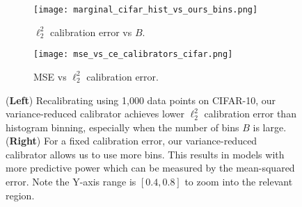 \begin{figure}
  \centering
  \centering
     \begin{subfigure}[b]{0.55\textwidth}
         \centering
         \texttt{[image: marginal\_cifar\_hist\_vs\_ours\_bins.png]}
         \caption{$\ell_2^2$ calibration error vs $B$.}
         \label{fig:marginal_calibrator_comparison_cifar}
     \end{subfigure}
     \hfill
     \begin{subfigure}[b]{0.4\textwidth}
         \centering
         \texttt{[image: mse\_vs\_ce\_calibrators\_cifar.png]}
         \caption{MSE vs $\ell_2^2$ calibration error.}
         \label{fig:cifar_calibrator_cmp_mse_ce}
     \end{subfigure}
  \caption{
  (\textbf{Left}) Recalibrating using 1,000 data points on CIFAR-10, our variance-reduced calibrator achieves lower $\ell_2^2$ calibration error than histogram binning, especially when the number of bins $B$ is large.
  (\textbf{Right}) For a fixed calibration error, our variance-reduced calibrator allows us to use more bins. This results in models with more predictive power which can be measured by the mean-squared error. Note the Y-axis range is $[0.4, 0.8]$ to zoom into the relevant region.
  }
  \label{fig:nan2}
\end{figure}



